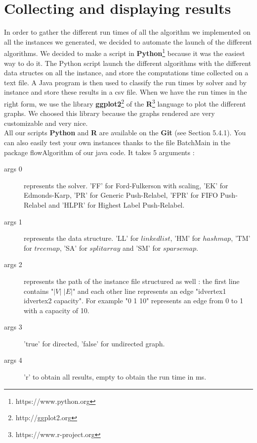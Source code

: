 \section{Collecting and displaying results}




In order to gather the different run times of all the algorithm we implemented on all the instances we generated, we decided to automate the launch of the different algorithms. We decided to make a script in \textbf{Python}\footnote{https://www.python.org} because it was the easiest way to do it. The Python script launch the different algorithms with the different data structes on all the instance, and store the computations time collected on a text file. A Java program is then used to classify the run times by solver and by instance and store these results in a csv file.
When we have the run times in the right form, we use the library \textbf{ggplot2}\footnote{http://ggplot2.org} of the \textbf{R}\footnote{https://www.r-project.org} language to plot the different graphs. We choosed this library because the graphs rendered are very customizable and  very nice. \\

All our scripts \textbf{Python} and \textbf{R} are available on the \textbf{Git} (see Section 5.4.1). You can also easily test your own instances thanks to the file BatchMain in the package flowAlgorithm of our java code. It takes 5 arguments :

\begin{description}
\item[args 0]{ represents the solver. 'FF' for Ford-Fulkerson with scaling, 'EK' for Edmonds-Karp, 'PR' for Generic Push-Relabel, 'FPR' for FIFO Push-Relabel and 'HLPR' for Highest Label Push-Relabel.}
\item[args 1]{ represents the data structure. 'LL' for $linkedlist$, 'HM' for $hashmap$, 'TM' for $treemap$, 'SA' for $splitarray$ and 'SM' for $sparsemap$.}
\item[args 2]{ represents the path of the instance file structured as well : the first line contains "$|V|$ $|E|$" and each other line represents an edge "idvertex1 idvertex2 capacity". For example "0 1 10" represents an edge from 0 to 1 with a capacity of 10.}
\item[args 3]{'true' for directed, 'false' for undirected graph.}
\item[args 4]{'r' to obtain all results, empty to obtain the run time in ms.}

\end{description} 
\newpage
